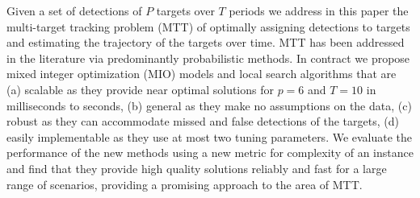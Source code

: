 Given a set of detections of $P$ targets over $T$ periods we address in this paper the multi-target tracking problem (MTT) of optimally assigning detections to targets and estimating the trajectory of the targets over time. MTT has been addressed in the literature via predominantly probabilistic methods. In contract we propose mixed integer optimization (MIO) models and local search algorithms that are (a)  scalable as they provide  near optimal solutions for $p=6$ and $T=10$ in milliseconds to seconds, (b) general as they make no assumptions on the data, (c) robust as they can accommodate missed and false detections of the targets, (d) easily implementable as they use at most two tuning parameters. We evaluate the performance of the new methods using a new metric for complexity of an instance and find that they provide high quality solutions reliably and fast for a large range of scenarios, providing a promising approach to the area of MTT. 